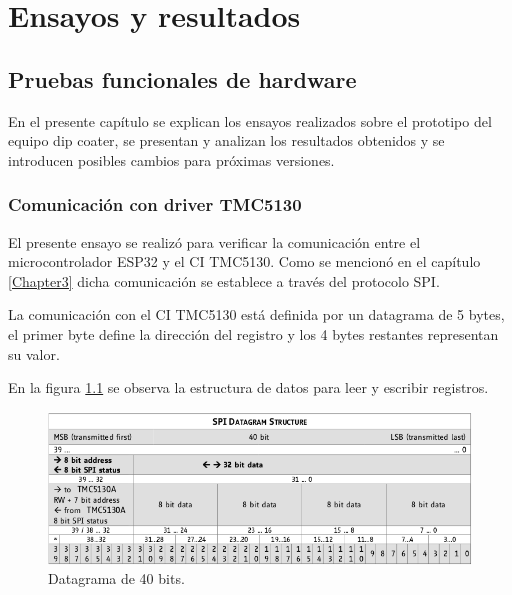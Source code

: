 
\chapter{Ensayos y resultados} %

\label{Chapter4} %


\section{Pruebas funcionales de hardware}

En el presente capítulo se explican los ensayos realizados sobre el prototipo del equipo dip coater, se presentan y analizan los resultados obtenidos y se introducen posibles cambios para próximas versiones.
\subsection{Comunicación con driver TMC5130}

El presente ensayo se realizó para verificar la comunicación entre el microcontrolador ESP32 y el CI TMC5130. Como se mencionó en el capítulo \ref{Chapter3} dicha comunicación se establece a través del  protocolo SPI.

La comunicación con el CI TMC5130 está definida por un datagrama de 5 bytes, el primer byte define la dirección del registro y los 4 bytes restantes representan su valor. 

En la figura \ref{fig:datagrama} se observa la estructura de datos para leer y escribir registros.
\begin{figure}[h]
\centering 
\includegraphics[width=1\textwidth]{./Figures/datagrama.png}
\caption{Datagrama de 40 bits.}
\label{fig:datagrama}
\end{figure}

